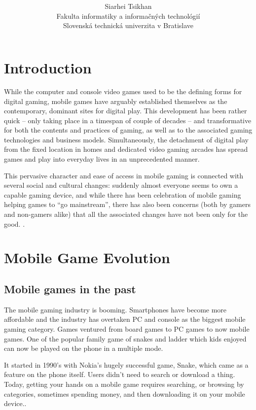 \documentclass[sig-alternate]{article}
\title{\vspace{-1em}\textbf{\sffamily{ Mobile games}}}
\author{                                                 
    \large {Siarhei Tsikhan} \\                         
    \normalsize{Fakulta informatiky a informačných technológií}\\              
    \normalsize {Slovenská technická univerzita v Bratislave}\\         
}
\date{}
\begin{document}
                   
\small          
			
\maketitle                         
				
\thispagestyle{fancy}     

\begin{multicols}{1}


\section{Introduction}
While the computer and console video games used to be the defining forms for digital gaming, mobile games have arguably established themselves as the contemporary, dominant sites for digital play. This development has been rather quick – only taking place in a timespan of couple of decades – and transformative for both the contents and practices of gaming, as well as to the associated gaming technologies and business models. Simultaneously, the detachment of digital play from the fixed location in homes and dedicated video gaming arcades has spread games and play into everyday lives in an unprecedented manner.

 This pervasive character and ease of access in mobile gaming is connected with several social and cultural changes: suddenly almost everyone seems to own a capable gaming device, and while there has been celebration of mobile gaming helping games to “go mainstream”, there has also been concerns (both by gamers and non-gamers alike) that all the associated changes have not been only for the good. \cite{Old}. 


\section{Mobile Game Evolution}
\subsection{Mobile games in the past}
The mobile gaming industry is booming. Smartphones have become more affordable and the industry has overtaken PC and console as the biggest mobile gaming category.
Games ventured from board games to PC games to now mobile games. One of the popular family game of snakes and ladder which kids enjoyed can now be played on the phone in a multiple mode.
 
It started in 1990’s with Nokia’s hugely successful game, Snake, which came as a feature on the phone itself. Users didn’t need to search or download a thing. Today, getting your hands on a mobile game requires searching, or browsing by categories, sometimes spending money, and then downloading it on your mobile device.\cite{Bad}. 


\end{multicols}
\end{document}

